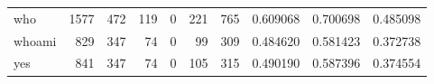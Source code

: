 \begin{longtable}{lrrrrrrrrr}
who       &                                1577 &                                             472 &                                            119 &                                             0 &                                            221 &                                          765 &                                           0.609068 &                               0.700698 &                             0.485098 \\
whoami    &                                 829 &                                             347 &                                             74 &                                             0 &                                             99 &                                          309 &                                           0.484620 &                               0.581423 &                             0.372738 \\
yes       &                                 841 &                                             347 &                                             74 &                                             0 &                                            105 &                                          315 &                                           0.490190 &                               0.587396 &                             0.374554 \\
\end{longtable}
